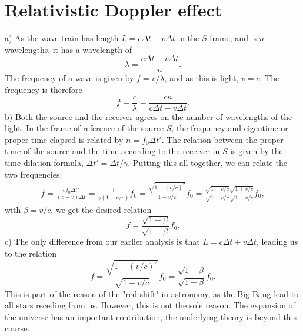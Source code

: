 \documentclass{article}
\begin{document}
    \section{Relativistic Doppler effect}
    a) As the wave train has length $L = c \Delta t - v \Delta t$ in the $S$ frame, and is $n$ wavelengths, it has a wavelength of 
    \begin{equation*}
        \lambda = \frac{c \Delta t - v \Delta t}{n}.
    \end{equation*}
    The frequency of a wave is given by $f = v / \lambda$, and as this is light, $v = c$. The frequency is therefore
    \begin{equation*}
        f = \frac{c}{\lambda} = \frac{cn}{c \Delta t - v \Delta t}.
    \end{equation*}
    b) Both the source and the receiver agrees on the number of wavelengths of the light. In the frame of reference of the source $S$, the frequency and eigentime or proper time elapsed is related by $n = f_0 \Delta t'$. The relation between the proper time of the source and the time according to the receiver in $S$ is given by the time dilation formula, $\Delta t' = \Delta t / \gamma$. Putting this all together, we can relate the two frequencies:
    \begin{align*}
        f = \frac{c f_0 \Delta t'}{(c - v)\Delta t} = \frac{1}{\gamma(1 - v/c)} f_0 = \frac{\sqrt{1 - (v/c)^2}}{1 - v/c} f_0 = \frac{\sqrt{1 - v/c}\sqrt{1 + v/c}}{\sqrt{1 - v/c}\sqrt{1 - v/c}}f_0,
    \end{align*} 
    with $\beta = v/c$, we get the desired relation
    \begin{equation*}
        f = \frac{\sqrt{1 + \beta}}{\sqrt{1 - \beta}}f_0.
    \end{equation*}
    c) The only difference from our earlier analysis is that $L = c \Delta t + v \Delta t$, leading us to the relation
    \begin{equation*}
        f = \frac{\sqrt{1 - (v/c)^2}}{\sqrt{1 + v/c}}f_0 = \frac{\sqrt{1 - \beta}}{\sqrt{1 + \beta}}f_0.
    \end{equation*}
    This is part of the reason of the "red shift" in astronomy, as the Big Bang lead to all stars receding from us. However, this is not the sole reason. The expansion of the universe has an important contribution, the underlying theory is beyond this course.
\end{document}
